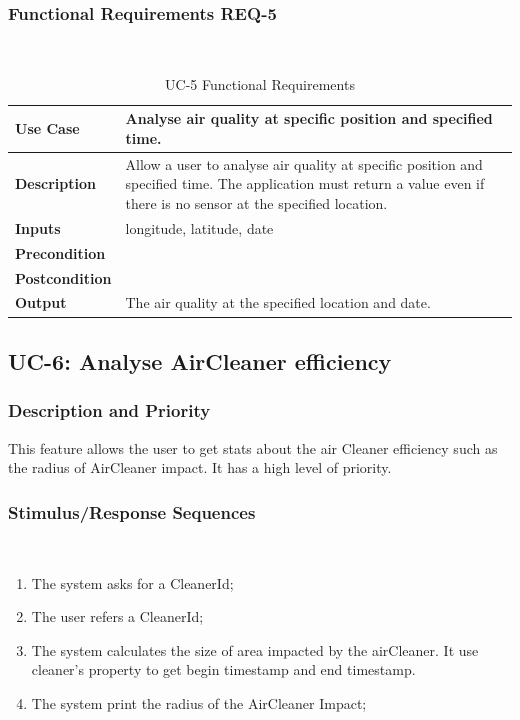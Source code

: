 \documentclass{report}
\begin{document}
\subsubsection*{Functional Requirements REQ-5} ~~~
\begin{table}[H]
	\begin{center}
		\begin{tabular}{|m{4cm}|m{10cm}|}
		\hline
		\textbf{Use Case} & Analyse air quality at specific position and specified time. \\
		\hline
		\textbf{Description} & Allow a user to analyse air quality at specific position and specified time. The application must return a value even if there is no sensor at the specified location. \\
		\hline
		\textbf{Inputs} &  longitude, latitude, date\\
		\hline
		\textbf{Precondition} &  \\
		\hline
		\textbf{Postcondition} &  \\
		\hline
		\textbf{Output} & The air quality at the specified location and date. \\
		\hline
		\end{tabular}
	\end{center}
	\caption{UC-5 Functional Requirements}
	\label{table:REQ-5}
\end{table}


\subsection{UC-6: Analyse AirCleaner efficiency}

\subsubsection*{Description and Priority}
This feature allows the user to get stats about the air Cleaner efficiency such as the radius of AirCleaner impact.
It has a high level of priority.

\subsubsection*{Stimulus/Response Sequences} ~~~
\begin{enumerate}
	\item The system asks for a CleanerId;
	\item The user refers a CleanerId;
	\item The system calculates the size of area impacted by the airCleaner. It use cleaner's property to get begin timestamp and end timestamp.
	\item The system print the radius of the AirCleaner Impact;
\end{enumerate}
\end{document}
